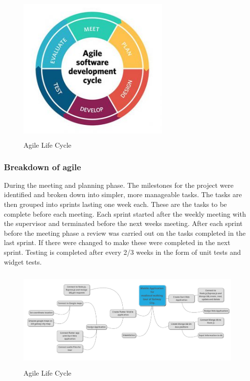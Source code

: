 \begin{figure}[ht!]
    \centering
 \includegraphics[width=75mm, height=75mm,scale=0.5]{img/agile.jpg}
\caption{Agile Life Cycle}
\label{fig:agile}
\end{figure}

\subsubsection{Breakdown of agile}
During the meeting and planning phase. The milestones for the project were identified and broken down into simpler, more manageable tasks. The tasks are then grouped into sprints lasting one week each. These are the tasks to be complete before each meeting. Each sprint started after the weekly meeting with the supervisor and terminated before the next weeks meeting. After each sprint before the meeting phase a review was carried out on the tasks completed in the last sprint. If there were changed to make these were completed in the next sprint. Testing is completed after every 2/3 weeks in the form of unit tests and widget tests.\cite{Agile}

\begin{figure}[ht]
    \centering
 \includegraphics[width=135mm, height=50mm,scale=0.5]{img/plan.png}
\caption{Agile Life Cycle}
\label{fig:Project Plan}
\end{figure}

